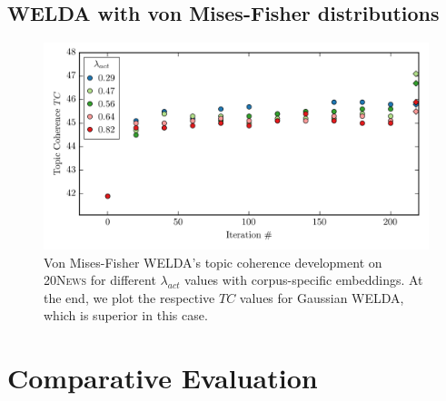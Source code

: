 \documentclass[
        a4paper,
        titlepage,
        twoside,
        parskip
        ]{scrbook}
\theoremstyle{break}
\begin{document}
\begin{appendices}
  \subsection{WELDA with von Mises-Fisher distributions}
  \label{sec:appendix_welda_vmf}
  \begin{figure}[H]
         \centering
         \includegraphics[width=\textwidth]{figures/welda_vmf_20news.png}
         \caption{Von Mises-Fisher WELDA's topic coherence development on \textsc{20News} for different $\lambda_{act}$ values with corpus-specific embeddings. At the end, we plot the respective $TC$ values for Gaussian WELDA, which is superior in this case.}
         \label{fig:welda_vmf_20news}
  \end{figure}

  \section{Comparative Evaluation}

\end{appendices}
\end{document}
